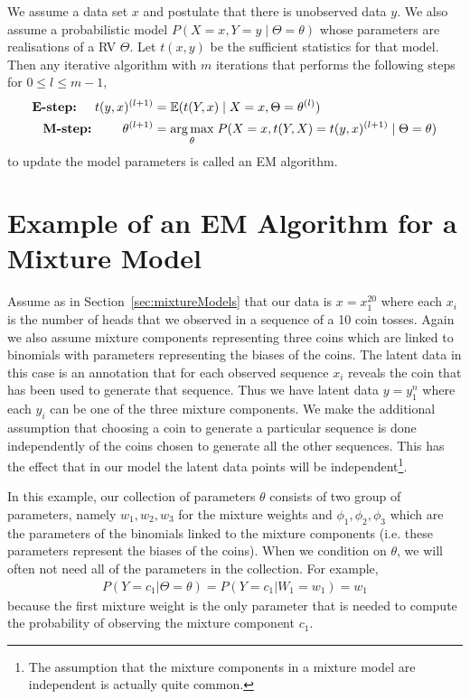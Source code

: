 \documentclass[11pt,leqno,a4paper]{report}\usepackage[]{graphicx}\usepackage[]{color}
\newcommand{\E}{\mathbb{E}}
\begin{document}
\begin{Definition}[EM algorithm]\label{def:EM}
We assume a data set $ x $ and postulate that there is unobserved data $ y $. We also
assume a probabilistic model $ P(X=x,Y=y \mid \Theta = \theta) $ whose parameters are realisations of a RV
$ \Theta $. Let $ t(x,y) $ be the sufficient statistics for that model. Then any
iterative algorithm with $ m $ iterations that performs the following
steps for $0\leq l \leq m-1$, 
\begin{align*}
\mbox{\textbf{E-step:} } \quad t(y,x)^{(l+1)} &= \E(t(Y,x) \mid X = x, \Theta = \theta^{(l)}) \\
\mbox{\textbf{M-step:} } \qquad \theta^{(l+1)} &= \underset{\theta}{\arg\max} \; P(X=x, t(Y,X) = t(y,x)^{(l+1)} \mid \Theta = \theta) 
\end{align*}
to update the model parameters is called an EM algorithm. 
\end{Definition}

\section{Example of an EM Algorithm for a Mixture Model}\label{sec:EMExample}

Assume as in Section~\ref{sec:mixtureModels} that our data is $ x=x^{20}_{1} $ where each $ x_{i} $ is the 
number of heads that we observed in a sequence of a 10 coin tosses. Again we also assume mixture components representing three coins which are linked
to binomials with parameters representing the biases of the coins. 
The latent data in this case is an annotation that for each observed sequence $ x_{i} $ reveals the coin that has been used
to generate that sequence. Thus we have latent data $ y=y_{1}^{n} $ where each $ y_{i} $ can be one of the three mixture components. 
We make the additional assumption that choosing a coin to generate a particular sequence is done independently of the coins chosen
to generate all the other sequences. This has the effect that in our model the latent data points will be independent\footnote{The assumption
that the mixture components in a mixture model are independent is actually quite common.}.

In this example, our collection of parameters $ \theta $ consists of two group of parameters, namely $ w_{1}, w_{2}, w_{3} $ for the mixture
weights and $ \phi_{1}, \phi_{2}, \phi_{3} $ which are the parameters of the binomials linked to the mixture components (i.e. these parameters
represent the biases of the coins). When we condition on $ \theta $, we will often not need all of the parameters in the collection. For example,
\begin{align*}
P(Y=c_{1}|\Theta=\theta) = P(Y=c_{1}|W_{1}=w_{1}) = w_{1}
\end{align*}
because the first mixture weight is the only parameter that is needed to compute 
the probability of observing the mixture component $ c_{1} $. 
\end{document}

